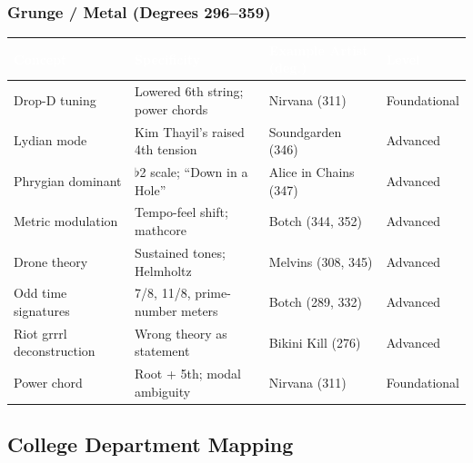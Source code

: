 \documentclass[11pt,letterpaper]{article}
\newcommand{\tblhdr}[1]{\textbf{\sffamily\textcolor{white}{#1}}}
\begin{document}
\subsubsection{Grunge / Metal (Degrees 296--359)}

\begin{center}
\begin{tabularx}{\textwidth}{L{3.8cm}XL{3.8cm}L{2.2cm}}
\toprule
{}
\tblhdr{Concept} & \tblhdr{Specificity} & \tblhdr{Example Artist (deg.)} & \tblhdr{Level} \\
\midrule
Drop-D tuning & Lowered 6th string; power chords & Nirvana (311) & Foundational \\
Lydian mode & Kim Thayil's raised 4th tension & Soundgarden (346) & Advanced \\
Phrygian dominant & $\flat$2 scale; ``Down in a Hole'' & Alice in Chains (347) & Advanced \\
Metric modulation & Tempo-feel shift; mathcore & Botch (344, 352) & Advanced \\
Drone theory & Sustained tones; Helmholtz & Melvins (308, 345) & Advanced \\
Odd time signatures & 7/8, 11/8, prime-number meters & Botch (289, 332) & Advanced \\
Riot grrrl deconstruction & Wrong theory as statement & Bikini Kill (276) & Advanced \\
Power chord & Root + 5th; modal ambiguity & Nirvana (311) & Foundational \\
\bottomrule
\end{tabularx}
\end{center}

\subsection{College Department Mapping}
\end{document}
